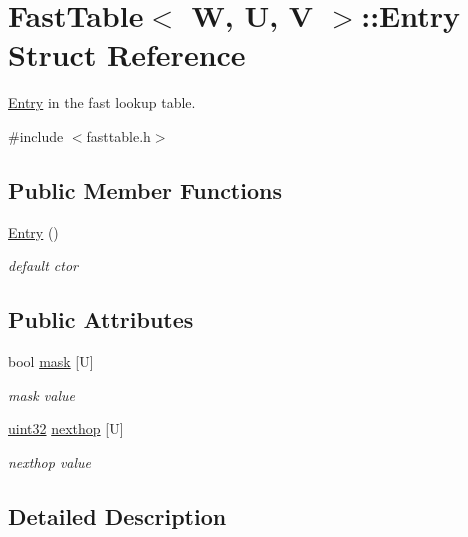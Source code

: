 \hypertarget{structFastTable_1_1Entry}{\section{Fast\-Table$<$ W, U, V $>$\-:\-:Entry Struct Reference}
\label{structFastTable_1_1Entry}
}


\hyperlink{structFastTable_1_1Entry}{Entry} in the fast lookup table.  




{\ttfamily \#include $<$fasttable.\-h$>$}

\subsection*{Public Member Functions}
\begin{DoxyCompactItemize}
\item 
\hyperlink{structFastTable_1_1Entry_aa6d556ec699f2a005db8781be930c34d}{Entry} ()
\begin{DoxyCompactList}\small\item\em default ctor \end{DoxyCompactList}\end{DoxyCompactItemize}
\subsection*{Public Attributes}
\begin{DoxyCompactItemize}
\item 
bool \hyperlink{structFastTable_1_1Entry_a0c80f3daf3a1fa1f2bb4db4db3ac8e74}{mask} \mbox{[}U\mbox{]}
\begin{DoxyCompactList}\small\item\em mask value \end{DoxyCompactList}\item 
\hyperlink{types_8h_abd01e8e67e3d94cab04ecaaf4f85ac1b}{uint32} \hyperlink{structFastTable_1_1Entry_a16ad0923c4753eaf976905068385f12f}{nexthop} \mbox{[}U\mbox{]}
\begin{DoxyCompactList}\small\item\em nexthop value \end{DoxyCompactList}\end{DoxyCompactItemize}


\subsection{Detailed Description}
